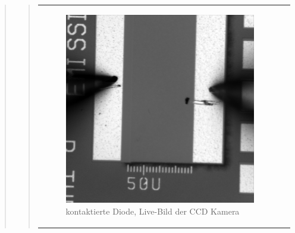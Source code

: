 \begin{quote}
\begin{quote}
         \begin{center}
                \begin{tabular}{ll}

                \hspace{-10em}
                    \begin{minipage}{0.6\textwidth}

                        \begin{figure}[H]
                            \label{fig:dfgsddsgf}
                            \includegraphics[scale=0.25, trim = 0cm 0cm 0cm
                            0cm,
                            clip]{./Emissionsbilder/eins/nach_Kontaktierung_vorMessung.png}
                            \caption{kontaktierte Diode, Live-Bild der CCD
                            Kamera}
                        \end{figure}

                    \end{minipage}
                    \begin{minipage}{0.6\textwidth}


\end{minipage}
\end{tabular}
\end{center}
\end{quote}
\end{quote}
